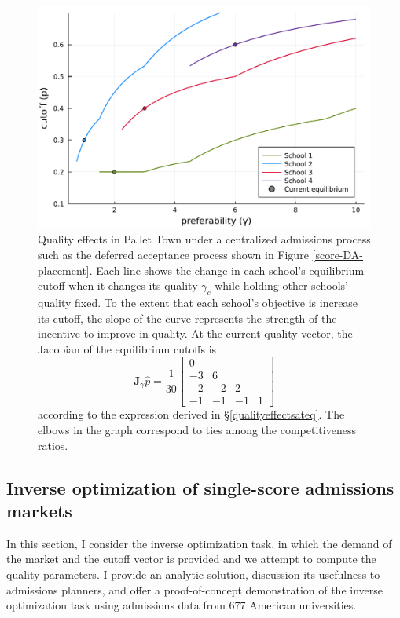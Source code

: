 \documentclass[12pt]{article}
\numberwithin{equation}{subsection}
\theoremstyle{definition}
\begin{document}
\begin{figure}
\begin{center}\includegraphics[width=\linewidth, ]{plots/vary-gamma-cutoff.pdf}\end{center}
\captionsetup{singlelinecheck=off}
    \caption[.]{Quality effects in Pallet Town under a centralized admissions process such as the deferred acceptance process shown in Figure \ref{score-DA-placement}. Each line shows the change in each school’s equilibrium cutoff when it changes its quality $\gamma_c$ while holding other schools’ quality fixed. To the extent that each school’s objective is increase its cutoff, the slope of the curve represents the strength of the incentive to improve in quality. At the current quality vector, the Jacobian of the equilibrium cutoffs is
    \begin{equation*}
    \mathbf{J}_\gamma \hat p = \frac{1}{30}
    \begin{bmatrix}
      0 & & & \\
      -3 & 6 & & \\
      -2 & -2 & 2 & \\
      -1 & -1 & -1 & 1 
    \end{bmatrix}
    \end{equation*} 
according to the expression derived in \S\ref{qualityeffectsateq}. The elbows in the graph correspond to ties among the competitiveness ratios. 
    }
\label{vary-gamma-cutoff}
\end{figure}








\subsection{Inverse optimization of single-score admissions markets}
In this section, I consider the inverse optimization task, in which the demand of the market and the cutoff vector is provided and we attempt to compute the quality parameters. I provide an analytic solution, discussion its usefulness to admissions planners, and offer a proof-of-concept demonstration of the inverse optimization task using admissions data from 677 American universities. 
\end{document}
